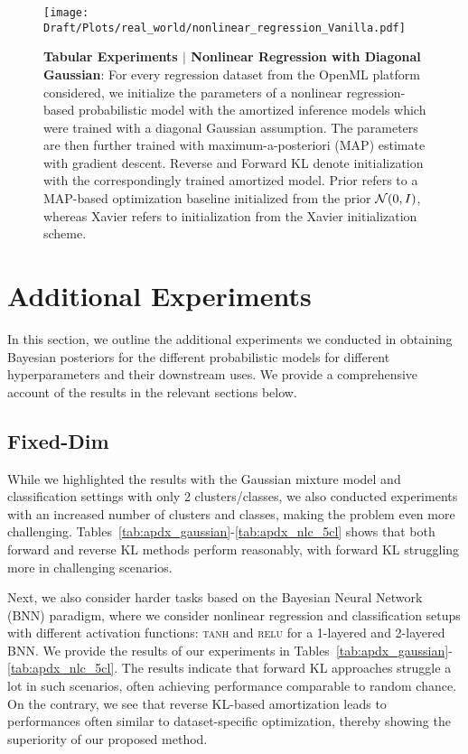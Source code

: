 \begin{figure}
    \centering
    \texttt{[image: Draft/Plots/real\_world/nonlinear\_regression\_Vanilla.pdf]}
    \caption{\textbf{Tabular Experiments $|$ Nonlinear Regression with Diagonal Gaussian}: For every regression dataset from the OpenML platform considered, we initialize the parameters of a nonlinear regression-based probabilistic model with the amortized inference models which were trained with a diagonal Gaussian assumption. The parameters are then further trained with maximum-a-posteriori (MAP) estimate with gradient descent. Reverse and Forward KL denote initialization with the correspondingly trained amortized model. Prior refers to a MAP-based optimization baseline initialized from the prior ${\mathcal{N}}(0, I)$, whereas Xavier refers to initialization from the Xavier initialization scheme.}
    \vspace{-5mm}
    \label{fig:regression_nonlinear_vanilla}
\end{figure}
\section{Additional Experiments}
\label{appdx:results}
In this section, we outline the additional experiments we conducted in obtaining Bayesian posteriors for the different probabilistic models for different hyperparameters and their downstream uses. We provide a comprehensive account of the results in the relevant sections below.

\subsection{Fixed-Dim}
\label{appdx:results_fixdim}
While we highlighted the results with the Gaussian mixture model and classification settings with only 2 clusters/classes, we also conducted experiments with an increased number of clusters and classes, making the problem even more challenging. Tables~\ref{tab:apdx_gaussian}-\ref{tab:apdx_nlc_5cl} shows that both forward and reverse KL methods perform reasonably, with forward KL struggling more in challenging scenarios.

Next, we also consider harder tasks based on the Bayesian Neural Network (BNN) paradigm, where we consider nonlinear regression and classification setups with different activation functions: \textsc{tanh} and \textsc{relu} for a 1-layered and 2-layered BNN. We provide the results of our experiments in Tables~\ref{tab:apdx_gaussian}-\ref{tab:apdx_nlc_5cl}. The results indicate that forward KL approaches struggle a lot in such scenarios, often achieving performance comparable to random chance. On the contrary, we see that reverse KL-based amortization leads to performances often similar to dataset-specific optimization, thereby showing the superiority of our proposed method.

